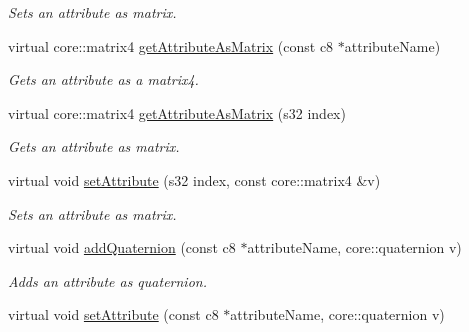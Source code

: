 \begin{DoxyCompactItemize}
\begin{DoxyCompactList}\small\item\em Sets an attribute as matrix. \end{DoxyCompactList}\item 
virtual core\-::matrix4 \hyperlink{classirr_1_1io_1_1_c_attributes_a006a1a6b9cdaa2616b6fa1cb263d6d43}{get\-Attribute\-As\-Matrix} (const c8 $\ast$attribute\-Name)
\begin{DoxyCompactList}\small\item\em Gets an attribute as a matrix4. \end{DoxyCompactList}\item 
virtual core\-::matrix4 \hyperlink{classirr_1_1io_1_1_c_attributes_a3d2dd614b344abebf506b70b8fbef440}{get\-Attribute\-As\-Matrix} (s32 index)
\begin{DoxyCompactList}\small\item\em Gets an attribute as matrix. \end{DoxyCompactList}\item 
\hypertarget{classirr_1_1io_1_1_c_attributes_ab243581d263899ec2388b7cd42b22f50}{virtual void \hyperlink{classirr_1_1io_1_1_c_attributes_ab243581d263899ec2388b7cd42b22f50}{set\-Attribute} (s32 index, const core\-::matrix4 \&v)}\label{classirr_1_1io_1_1_c_attributes_ab243581d263899ec2388b7cd42b22f50}

\begin{DoxyCompactList}\small\item\em Sets an attribute as matrix. \end{DoxyCompactList}\item 
\hypertarget{classirr_1_1io_1_1_c_attributes_a1a702eb1b4ca361e33d9d4d8a7a27483}{virtual void \hyperlink{classirr_1_1io_1_1_c_attributes_a1a702eb1b4ca361e33d9d4d8a7a27483}{add\-Quaternion} (const c8 $\ast$attribute\-Name, core\-::quaternion v)}\label{classirr_1_1io_1_1_c_attributes_a1a702eb1b4ca361e33d9d4d8a7a27483}

\begin{DoxyCompactList}\small\item\em Adds an attribute as quaternion. \end{DoxyCompactList}\item 
\hypertarget{classirr_1_1io_1_1_c_attributes_a7a87594248181d6cfd145820e0e327f3}{virtual void \hyperlink{classirr_1_1io_1_1_c_attributes_a7a87594248181d6cfd145820e0e327f3}{set\-Attribute} (const c8 $\ast$attribute\-Name, core\-::quaternion v)}\label{classirr_1_1io_1_1_c_attributes_a7a87594248181d6cfd145820e0e327f3}


\end{DoxyCompactItemize}
